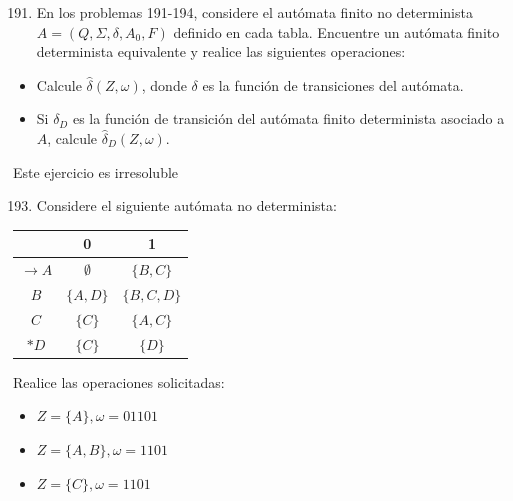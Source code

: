 \documentclass[12pt]{article}
\begin{document}
\vspace{0.3cm}
\begin{enumerate}
\setcounter{enumi}{190}
\item
En los problemas 191-194, considere el autómata finito no determinista $A = (Q, \Sigma, \delta, A_0, F)$ definido en cada tabla. Encuentre un autómata finito determinista equivalente y realice las siguientes operaciones:
\end{enumerate}

\begin{itemize}
    \item[a)] Calcule $\hat{\delta}(Z,\omega)$, donde $\delta$ es la función de transiciones del autómata.
    \item[b)] Si $\delta_D$ es la función de transición del autómata finito determinista asociado a $A$, calcule $\hat{\delta}_D(Z,\omega)$.
\end{itemize}

Este ejercicio es irresoluble

\vspace{0.5cm}   
\begin{enumerate}
    \setcounter{enumi}{192}
    \item Considere el siguiente autómata no determinista:
\end{enumerate}
    
\begin{center}
    \begin{tabular}{c|cc}
        & 0 & 1 \\
        \hline
        $\rightarrow A$ & $\emptyset$ & $\{B, C\}$ \\
        $B$ & $\{A, D\}$ & $\{B, C, D\}$ \\
        $C$ & $\{C\}$ & $\{A, C\}$ \\
        $*D$ & $\{C\}$ & $\{D\}$ \\
    \end{tabular}
\end{center}
    
    \vspace{0.3cm}
    Realice las operaciones solicitadas:
    
    \begin{itemize}
        \item[a)] $Z = \{A\}, \omega = 01101$
        \item[b)] $Z = \{A, B\}, \omega = 1101$
        \item[c)] $Z = \{C\}, \omega = 1101$
    \end{itemize}
\end{document}
